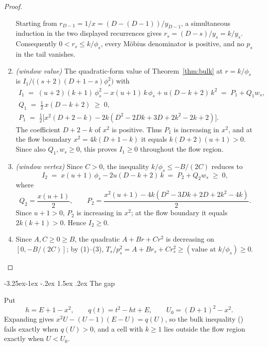 \documentclass[twoside,10pt]{article}
\makeatletter
\numberwithin{equation}{section}
\theoremstyle{slbody}
\theoremstyle{definition}
\theoremstyle{remark}
\numberwithin{theorem}{section}
\renewcommand{\eqref}[1]{%
  \textup{{\normalfont(\oldstylenums{\ref{#1}}}\normalfont)}}
\renewcommand{\subsection}{%
  \@startsection{subsection}{2}{\z@}%
    {-3.25ex\@plus -1ex \@minus -.2ex}%
    {1.5ex \@plus .2ex}%
    {\normalfont\normalsize\bfseries}}
\makeatother
\begin{document}
\begin{proof}
\begin{enumerate}
  Starting from $r_{D-1}=1/x=(D-(D-1))/y_{D-1}$, a simultaneous induction
  in the two displayed recurrences gives
  $r_s=(D-s)/y_s=k/y_s$.  Consequently
  $0<r_s\le k/\phi_s$, every M\"obius denominator is positive, and no
  $p_s$ in the tail vanishes.
\item \emph{(window value)}  The quadratic-form value of
  Theorem~\ref{thm:bulk} at $r=k/\phi_s$ is
  $I_1/\bigl((s+2)(D+1-s)\phi_s^2\bigr)$
  with
  \begin{equation}\label{eq:I1}
  \begin{gathered}
    I_1 \;=\; (u+2)(k+1)\,\phi_s^2 - x(u+1)\,k\,\phi_s
        + u(D-k+2)\,k^2
        \;=\; P_1+Q_1w_s,\\
    Q_1 \;=\; \tfrac12\,x(D-k+2) \;\ge\; 0,\\
    P_1 \;=\; \tfrac12\bigl[x^2(D+2-k)-2k(D^2-2Dk+3D+2k^2-2k+2)\bigr].
  \end{gathered}
  \end{equation}
  The coefficient $D+2-k$ of $x^2$ is positive.  Thus $P_1$ is increasing
  in $x^2$, and at the flow boundary $x^2=4k(D+1-k)$ it equals
  $k(D+2)(u+1)>0$.  Since also $Q_1,w_s\ge0$, this proves $I_1\ge0$
  throughout the flow region.
\item \emph{(window vertex)}  Since $C>0$, the inequality
  $k/\phi_s\le -B/(2C)$ reduces to
  \begin{equation}\label{eq:I2}
    I_2 \;=\; x(u+1)\,\phi_s - 2u(D-k+2)\,k
      \;=\; P_2+Q_2w_s\;\ge\;0 ,
  \end{equation}
  where
  \[
    Q_2=\frac{x(u+1)}2,\qquad
    P_2=\frac{x^2(u+1)
      -4k(D^2-3Dk+2D+2k^2-4k)}2 .
  \]
  Since $u+1>0$, $P_2$ is increasing in $x^2$; at the flow boundary it
  equals $2k(k+1)>0$.  Hence $I_2\ge0$.
\item Since $A,C\ge 0\ge B$, the quadratic $A+Br+Cr^2$ is decreasing on
  $[0,-B/(2C)]$; by (1)--(3),
  $T_s/p_s^2=A+Br_s+Cr_s^2
  \ge(\text{value at }k/\phi_s)\ge 0$. \qedhere
\end{enumerate}
\end{proof}

\subsection{The gap}\label{subsec:gap}

Put
\[
 h=E+1-x^2,\qquad q(t)=t^2-ht+E,\qquad U_0=(D+1)^2-x^2 .
\]
Expanding gives $x^2U-(U-1)(E-U)=q(U)$, so the bulk inequality
\eqref{eq:bulk} fails exactly when $q(U)>0$, and a cell with $k\ge1$ lies
outside the flow region exactly when $U<U_0$.
\end{document}
